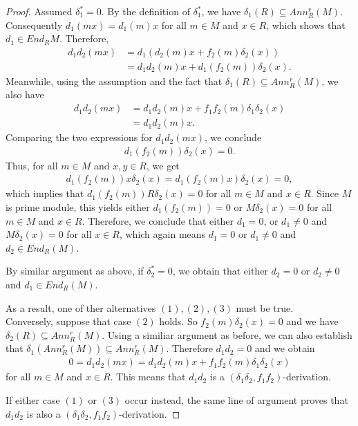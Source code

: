 \documentclass{arxiv}
\begin{document}
\begin{proof}
    Assumed $\delta_1^*=0$. By the definition of $\delta_1^*$, we have $\delta_1(R)\subseteq Ann_R^r(M)$. Consequently $d_1(mx)=d_1(m)x$ for all $m \in M$ and $x \in R$, which shows that $d_1 \in End_R M$. Therefore, 
    \begin{align*}
        d_1d_2(mx)&= d_1(d_2(m)x+f_2(m)\delta_2(x))\\
        &= d_1d_2(m)x+d_1(f_2(m))\delta_2(x).
    \end{align*}
    Meanwhile, using the assumption and the fact that $\delta_1(R)\subseteq Ann_R^r(M)$, we also have
    \begin{align*}
        d_1d_2(mx)&=d_1d_2(m)x+f_1f_2(m)\delta_1\delta_2(x)\\
        &= d_1d_2(m)x.
    \end{align*}
    Comparing the two expressions for $d_1d_2(mx)$, we conclude
    \begin{align*}
        d_1(f_2(m))\delta_2(x) = 0.
    \end{align*}
    Thus, for all $m \in M$ and $x,y\in R$, we get
    \begin{align*}
        d_1(f_2(m))x\delta_2(x)=d_1(f_2(m)x)\delta_2(x)=0,
    \end{align*}
    which implies that $d_1(f_2(m))R\delta_2(x)=0$ for all $m \in M$ and $x \in R$. Since $M$ is prime module, this yields either $d_1(f_2(m))=0$ or $M \delta_2(x)=0$ for all $m \in M$ and $x \in R$. Therefore, we conclude that either $d_1=0$, or $d_1 \ne 0$ and $M\delta_2(x) =0$ for all $x \in R$, which again means $d_1=0$ or $d_1 \ne 0$ and $d_2 \in End_R(M)$.

    By similar argument as above, if $\delta_2^*=0$, we obtain that either $d_2=0$ or $d_2 \ne 0$ and $d_1 \in End_R(M)$.

    As a result, one of ther alternatives $(1),(2),(3)$ must be true.
    \\
    Conversely, suppose that case $(2)$ holds. So $f_2(m)\delta_2(x)=0$ and we have $\delta_2(R)\subseteq Ann_R^r(M)$. Using a similiar argument as before, we can also establish that $\delta_1(Ann_R^r(M))\subseteq Ann_R^r(M)$. Therefore $d_1d_2=0$ and we obtain
    \begin{align*}
        0 = d_1d_2(mx)=d_1d_2(m)x+f_1f_2(m)\delta_1\delta_2(x)
    \end{align*}
    for all $m \in M$ and $x \in R$. This means that $d_1d_2$ is a $(\delta_1\delta_2,f_1f_2)$-derivation.

    If either case $(1)$ or $(3)$ occur instead, the same line of argument proves that $d_1d_2$ is also a  $(\delta_1\delta_2,f_1f_2)$-derivation.
\end{proof}
\end{document}
